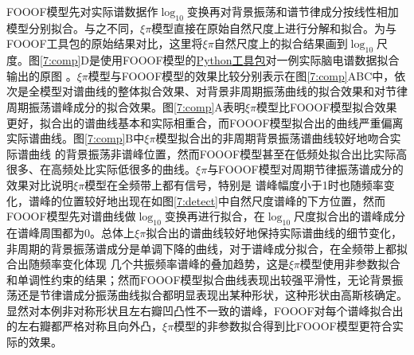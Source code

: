 FOOOF模型先对实际谱数据作$\log_{10}$变换再对背景振荡和谱节律成分按线性相加模型分别拟合。与之不同，$\xi\pi$模型直接在原始自然尺度上进行分解和拟合。为与FOOOF工具包的原始结果对比，这里将$\xi\pi$自然尺度上的拟合结果画到$\log_{10}$尺度。图\ref{7:comp}D是使用FOOOF模型的\href{https://github.com/fooof-tools/fooof/tree/master/fooof}{Python工具包}对一例实际脑电谱数据拟合输出的原图
。$\xi\pi$模型与FOOOF模型的效果比较分别表示在图\ref{7:comp}ABC中，依次是全模型对谱曲线的整体拟合效果、对背景非周期振荡曲线的拟合效果和对节律周期振荡谱峰成分的拟合效果。图\ref{7:comp}A表明$\xi\pi$模型比FOOOF模型拟合效果更好，拟合出的谱曲线基本和实际相重合，而FOOOF模型拟合出的曲线严重偏离实际谱曲线。图\ref{7:comp}B中$\xi\pi$模型拟合出的非周期背景振荡谱曲线较好地吻合实际谱曲线
的背景振荡非谱峰位置，然而FOOOF模型甚至在低频处拟合出比实际高很多、在高频处比实际低很多的曲线。$\xi\pi$与FOOOF模型对周期节律振荡谱成分的效果对比说明$\xi\pi$模型在全频带上都有信号，特别是
谱峰幅度小于1时也随频率变化，谱峰的位置较好地出现在如图\ref{7:detect}中自然尺度谱峰的下方位置，然而FOOOF模型先对谱曲线做$\log_{10}$变换再进行拟合，在$\log_{10}$尺度拟合出的谱峰成分在谱峰周围都为0。总体上$\xi\pi$拟合出的谱曲线较好地保持实际谱曲线的细节变化，非周期的背景振荡谱成分是单调下降的曲线，对于谱峰成分拟合，在全频带上都拟合出随频率变化体现
几个共振频率谱峰的叠加趋势，这是$\xi\pi$模型使用非参数拟合和单调性约束的结果；然而FOOOF模型拟合曲线表现出较强平滑性，无论背景振荡还是节律谱成分振荡曲线拟合都明显表现出某种形状，这种形状由高斯核确定。显然对本例非对称形状且左右瓣凹凸性不一致的谱峰，FOOOF对每个谱峰拟合出的左右瓣都严格对称且向外凸，$\xi\pi$模型的非参数拟合得到比FOOOF模型更符合实际的效果。

